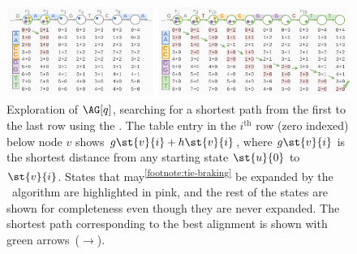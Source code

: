 \begin{figure}[t]
    \centering
	\includegraphics[width=\linewidth]{figures/seed-heuristic-tables}
	\caption{Exploration of $\AG[q]$, searching for a shortest path from the
	first to the last row using the \seedh. The table entry in the $i^\text{th}$
	row (zero indexed) below node $v$ shows $g\st{v}{i}+h\st{v}{i}$, where
	$g\st{v}{i}$ is the shortest distance from any starting state $\st{u}{0}$ to
	$\st{v}{i}$.
	States that may\textsuperscript{\cref{footnote:tie-braking}} be expanded by
	the \A~algorithm are highlighted in \colorbox{pink-highlight}{pink}, and the
	rest of the states are shown for completeness even though they are never
	expanded. The shortest path corresponding to the best alignment is shown
	with green arrows~(\textcolor{dark-green}{$\pmb{\rightarrow}$}).}
	\label{fig:exploration-table}
\end{figure}
